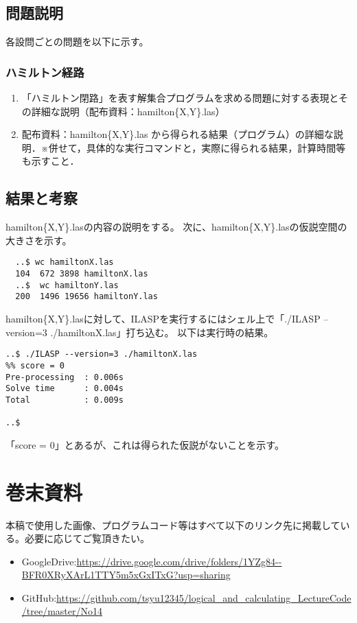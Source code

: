 \documentclass[dvipdfmx]{jsarticle}
\begin{document}
\subsection{問題説明}
各設問ごとの問題を以下に示す。
\subsubsection{ハミルトン経路}
\begin{enumerate}
  \item 「ハミルトン閉路」を表す解集合プログラムを求める問題に対する表現とその詳細な説明（配布資料：hamilton\{X,Y\}.las）
  \item 配布資料：hamilton\{X,Y\}.las から得られる結果（プログラム）の詳細な説明．※併せて，具体的な実行コマンドと，実際に得られる結果，計算時間等も示すこと．

\end{enumerate}
\subsection{結果と考察}
hamilton\{X,Y\}.lasの内容の説明をする。
次に、hamilton\{X,Y\}.lasの仮説空間の大きさを示す。
\begin{verbatim}
  ..$ wc hamiltonX.las
  104  672 3898 hamiltonX.las
  ..$  wc hamiltonY.las
  200  1496 19656 hamiltonY.las
\end{verbatim}
hamilton\{X,Y\}.lasに対して、ILASPを実行するにはシェル上で「./ILASP --version=3 ./hamiltonX.las」打ち込む。
以下は実行時の結果。
\begin{verbatim}
..$ ./ILASP --version=3 ./hamiltonX.las
%% score = 0
Pre-processing  : 0.006s
Solve time      : 0.004s
Total           : 0.009s

..$
\end{verbatim}
「score = 0」とあるが、これは得られた仮説がないことを示す。









\section{巻末資料}
  本稿で使用した画像、プログラムコード等はすべて以下のリンク先に掲載している。必要に応じてご覧頂きたい。
  \begin{itemize}
    \item GoogleDrive:\url{https://drive.google.com/drive/folders/1YZg84--BFR0XRyXArL1TTY5m5xGxITxG?usp=sharing}
    \item GitHub:\url{https://github.com/tsyu12345/logical_and_calculating_LectureCode/tree/master/No14}
  \end{itemize}
\end{document}
